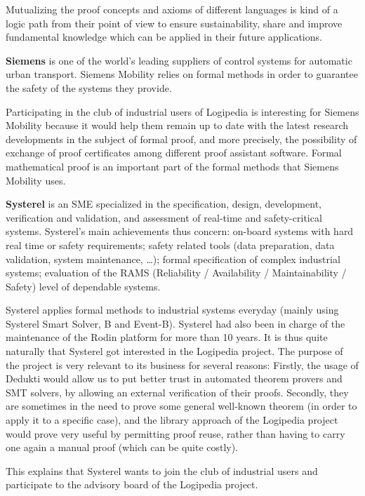 Mutualizing the proof concepts and axioms of different languages is
kind of a logic path from their point of view to ensure
sustainability, share and improve fundamental knowledge which can be
applied in their future applications.

{\bf Siemens} is one of the world's leading suppliers of control
systems for automatic urban transport. Siemens Mobility relies on
formal methods in order to guarantee the safety of the systems they
provide.

Participating in the club of industrial users of Logipedia is
interesting for Siemens Mobility because it would help them remain up
to date with the latest research developments in the subject of formal
proof, and more precisely, the possibility of exchange of proof
certificates among different proof assistant software. Formal
mathematical proof is an important part of the formal methods that
Siemens Mobility uses.

{\bf Systerel} is an SME specialized in the specification, design,
development, verification and validation, and assessment of real-time
and safety-critical systems. Systerel's main achievements thus
concern: on-board systems with hard real time or safety requirements;
safety related tools (data preparation, data validation, system
maintenance, \ldots); formal specification of complex industrial
systems; evaluation of the RAMS (Reliability / Availability /
Maintainability / Safety) level of dependable systems.

Systerel applies formal methods to industrial systems everyday (mainly
using Systerel Smart Solver, B and Event-B). Systerel had also been in
charge of the maintenance of the Rodin platform for more than 10
years. It is thus quite naturally that Systerel got interested in the
Logipedia project. The purpose of the project is very relevant to its
business for several reasons: Firstly, the usage of Dedukti would
allow us to put better trust in automated theorem provers and SMT
solvers, by allowing an external verification of their
proofs. Secondly, they are sometimes in the need to prove some general
well-known theorem (in order to apply it to a specific case), and the
library approach of the Logipedia project would prove very useful by
permitting proof reuse, rather than having to carry one again a manual
proof (which can be quite costly).

This explains that Systerel wants to join the club of industrial users 
and participate to the advisory board of the Logipedia project.

